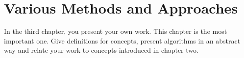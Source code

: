 \chapter{Various Methods and Approaches} \label{chapter_three}

In the third chapter, you present your own work. This chapter is the most important one. Give definitions for concepts, present algorithms in an abstract way and relate your work to concepts introduced in chapter two.